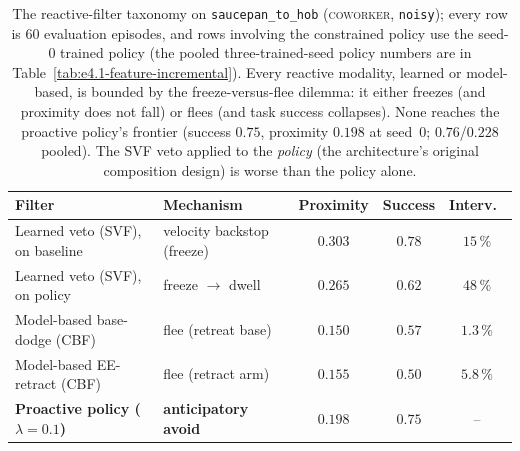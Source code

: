 \documentclass[11pt,a4paper]{report}
\newcommand{\coworker}{\textsc{coworker}}
\begin{document}
\begin{table}[htbp]
\centering
\caption{The reactive-filter taxonomy on \texttt{saucepan\_to\_hob}
(\coworker{}, \texttt{noisy}); every row is 60 evaluation episodes,
and rows involving the constrained policy use the seed-0 trained
policy (the pooled three-trained-seed policy numbers are in
Table~\ref{tab:e4.1-feature-incremental}). Every reactive modality,
learned or model-based, is bounded by the freeze-versus-flee dilemma:
it either freezes (and proximity does not fall) or flees (and task
success collapses). None reaches the proactive policy's frontier
(success $0.75$, proximity $0.198$ at seed~0; $0.76$/$0.228$ pooled).
The SVF veto applied to the \emph{policy} (the architecture's
original composition design) is worse than the policy alone.}
\label{tab:filter-taxonomy}
\small
\begin{tabular}{llccc}
\toprule
Filter & Mechanism & Proximity & Success & Interv.\ \\
\midrule
Learned veto (SVF), on baseline   & velocity backstop (freeze) & $0.303$ & $0.78$ & $15\,\%$ \\
Learned veto (SVF), on policy     & freeze $\to$ dwell         & $0.265$ & $0.62$ & $48\,\%$ \\
Model-based base-dodge (CBF)      & flee (retreat base)        & $0.150$ & $0.57$ & $1.3\,\%$ \\
Model-based EE-retract (CBF)      & flee (retract arm)         & $0.155$ & $0.50$ & $5.8\,\%$ \\
\textbf{Proactive policy ($\lambda{=}0.1$)} & \textbf{anticipatory avoid} & $\mathbf{0.198}$ & $\mathbf{0.75}$ & -- \\
\bottomrule
\end{tabular}
\end{table}
\end{document}
